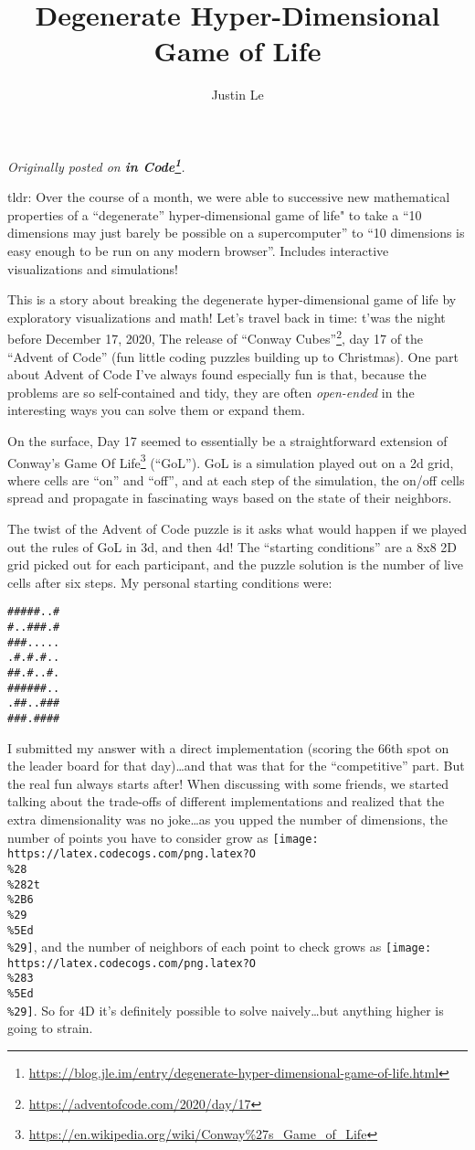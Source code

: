 \documentclass[]{article}
\title{Degenerate Hyper-Dimensional Game of Life}
\author{Justin Le}
\renewcommand{\href}[2]{#2\footnote{\url{#1}}}
\begin{document}
\maketitle

\emph{Originally posted on
\textbf{\href{https://blog.jle.im/entry/degenerate-hyper-dimensional-game-of-life.html}{in
Code}}.}

tldr: Over the course of a month, we were able to successive new mathematical
properties of a ``degenerate'' hyper-dimensional game of life" to take a ``10
dimensions may just barely be possible on a supercomputer'' to ``10 dimensions
is easy enough to be run on any modern browser''. Includes interactive
visualizations and simulations!

This is a story about breaking the degenerate hyper-dimensional game of life by
exploratory visualizations and math! Let's travel back in time: t'was the night
before December 17, 2020, The release of
\href{https://adventofcode.com/2020/day/17}{``Conway Cubes''}, day 17 of the
``Advent of Code'' (fun little coding puzzles building up to Christmas). One
part about Advent of Code I've always found especially fun is that, because the
problems are so self-contained and tidy, they are often \emph{open-ended} in the
interesting ways you can solve them or expand them.

On the surface, Day 17 seemed to essentially be a straightforward extension of
\href{https://en.wikipedia.org/wiki/Conway\%27s_Game_of_Life}{Conway's Game Of
Life} (``GoL''). GoL is a simulation played out on a 2d grid, where cells are
``on'' and ``off'', and at each step of the simulation, the on/off cells spread
and propagate in fascinating ways based on the state of their neighbors.

The twist of the Advent of Code puzzle is it asks what would happen if we played
out the rules of GoL in 3d, and then 4d! The ``starting conditions'' are a 8x8
2D grid picked out for each participant, and the puzzle solution is the number
of live cells after six steps. My personal starting conditions were:

\begin{verbatim}
#####..#
#..###.#
###.....
.#.#.#..
##.#..#.
######..
.##..###
###.####
\end{verbatim}

I submitted my answer with a direct implementation (scoring the 66th spot on the
leader board for that day)\ldots and that was that for the ``competitive'' part.
But the real fun always starts after! When discussing with some friends, we
started talking about the trade-offs of different implementations and realized
that the extra dimensionality was no joke\ldots as you upped the number of
dimensions, the number of points you have to consider grow as
\texttt{[image: https://latex.codecogs.com/png.latex?O\\\%28\\\%282t\\\%2B6\\\%29\\\%5Ed\\\%29]},
and the number of neighbors of each point to check grows as
\texttt{[image: https://latex.codecogs.com/png.latex?O\\\%283\\\%5Ed\\\%29]}. So for
4D it's definitely possible to solve naively\ldots but anything higher is going
to strain.
\end{document}
